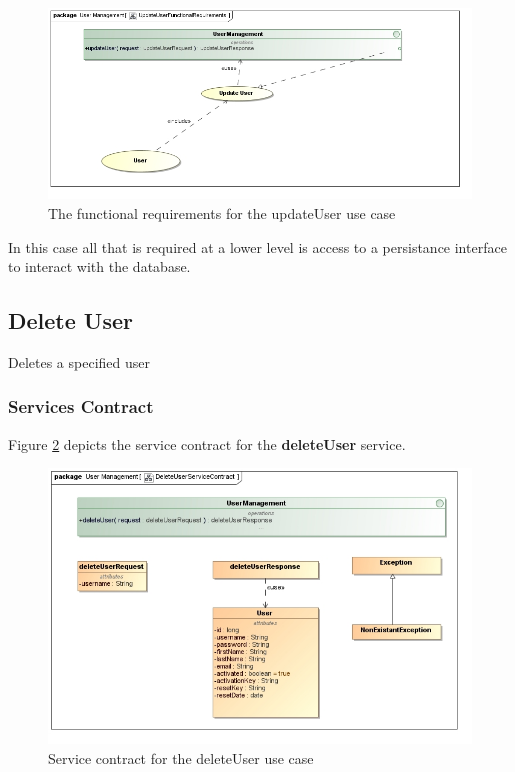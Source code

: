 \begin{figure}[H]
	\begin{center}
		\includegraphics[scale=0.5]{../Diagrams and Charts/Users/UpdateUserFunctionalRequirements.jpg}
		\caption{The functional requirements for the updateUser use case}
		\label{updateUserFR}
	\end{center}	
\end{figure}

In this case all that is required at a lower level is access to a persistance
interface to interact with the database.

\subsection{Delete User}
Deletes a specified user

\subsubsection{Services Contract}
Figure \ref{fig:DeleteUserSC} depicts the service
contract for the \textbf{deleteUser} service.

\begin{figure}[H]
	\begin{center}
		\includegraphics[scale=0.55]{../Diagrams and Charts/Users/DeleteUserServiceContract.jpg}
		\caption{Service contract for the deleteUser use case}
		\label{fig:DeleteUserSC}
	\end{center}
\end{figure}

